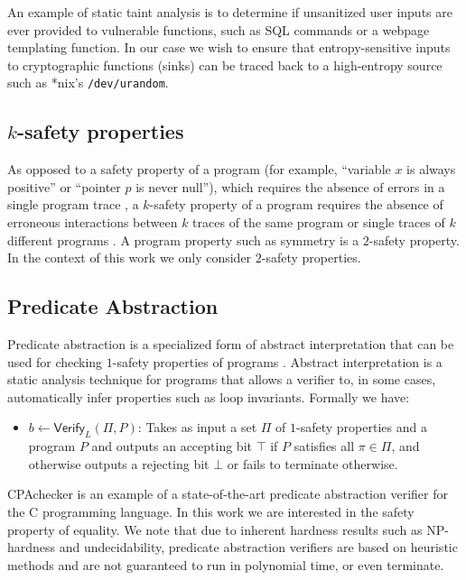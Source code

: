 \documentclass[letterpaper,twocolumn,10pt]{article}
\begin{document}
An example of static taint analysis is to determine if unsanitized user inputs are ever provided to vulnerable functions, such as SQL commands or
a webpage templating function. In our case we wish to ensure that entropy-sensitive inputs to cryptographic functions (sinks) can be
traced back to a high-entropy source such as *nix's \texttt{/dev/urandom}.

\subsection{$k$-safety properties}

As opposed to a safety property of a program (for example, ``variable $x$ is always positive'' or ``pointer $p$ is never null''), which requires
the absence of errors in a single program trace \cite{alpern1987recognizing}, a $k$-safety property of a program requires the absence of erroneous interactions between $k$
traces of the same program or single traces of $k$ different programs \cite{sousa2016cartesian}. A program property such as symmetry is a $2$-safety property. In the context of this
work we only consider $2$-safety properties.


\subsection{Predicate Abstraction}
\label{sec:predabstraction}

Predicate abstraction is a specialized form of abstract interpretation that can be used for checking $1$-safety properties of programs
\cite{flanagan2002predicate}. Abstract interpretation is a static analysis technique for programs that allows a verifier to, in some cases, 
automatically infer properties such as loop invariants. Formally we have:

\begin{itemize}
    \item $b \gets \mathsf{Verify}_{L}(\Pi, P)$: Takes as input a set $\Pi$ of $1$-safety properties and a program $P$ and outputs an accepting bit $\top$ if
    $P$ satisfies all $\pi \in \Pi$, and otherwise outputs a rejecting bit $\bot$ or fails to terminate otherwise.
\end{itemize}

CPAchecker \cite{beyer2011cpachecker} is an example of a state-of-the-art predicate abstraction verifier for the C programming language. In this work
we are interested in the safety property of equality. We note that due to inherent hardness results such as NP-hardness and undecidability, predicate
abstraction verifiers are based on heuristic methods and are not guaranteed to run in polynomial time, or even terminate.
\end{document}
